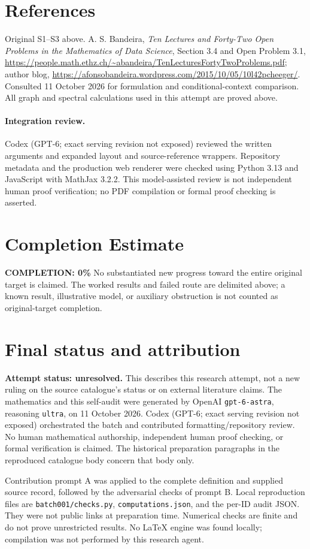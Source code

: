 \documentclass[11pt,a4paper]{article}
\begin{document}
\section{References}
Original S1--S3 above. A. S. Bandeira, \emph{Ten Lectures and Forty-Two Open Problems in the Mathematics of Data Science}, Section 3.4 and Open Problem 3.1, \url{https://people.math.ethz.ch/~abandeira/TenLecturesFortyTwoProblems.pdf}; author blog, \url{https://afonsobandeira.wordpress.com/2015/10/05/10l42pcheeger/}. Consulted 11 October 2026 for formulation and conditional-context comparison. All graph and spectral calculations used in this attempt are proved above.


\paragraph{Integration review.} Codex (GPT-6; exact serving revision not exposed) reviewed the written arguments and expanded layout and source-reference wrappers. Repository metadata and the production web renderer were checked using Python 3.13 and JavaScript with MathJax 3.2.2. This model-assisted review is not independent human proof verification; no PDF compilation or formal proof checking is asserted.

\section{Completion Estimate}
\noindent\textbf{COMPLETION: 0\%}
No substantiated new progress toward the entire original target is claimed. The worked results and failed route are delimited above; a known result, illustrative model, or auxiliary obstruction is not counted as original-target completion.

\section{Final status and attribution}
\textbf{Attempt status: unresolved.} This describes this research attempt, not a new ruling on the source catalogue's status or on external literature claims.
The mathematics and this self-audit were generated by OpenAI \texttt{gpt-6-astra}, reasoning \texttt{ultra}, on 11 October 2026. Codex (GPT-6; exact serving revision not exposed) orchestrated the batch and contributed formatting/repository review. No human mathematical authorship, independent human proof checking, or formal verification is claimed. The historical preparation paragraphs in the reproduced catalogue body concern that body only.

Contribution prompt A was applied to the complete definition and supplied source record, followed by the adversarial checks of prompt B. Local reproduction files are \texttt{batch001/checks.py}, \texttt{computations.json}, and the per-ID audit JSON. They were not public links at preparation time. Numerical checks are finite and do not prove unrestricted results. No LaTeX engine was found locally; compilation was not performed by this research agent.
\end{document}
